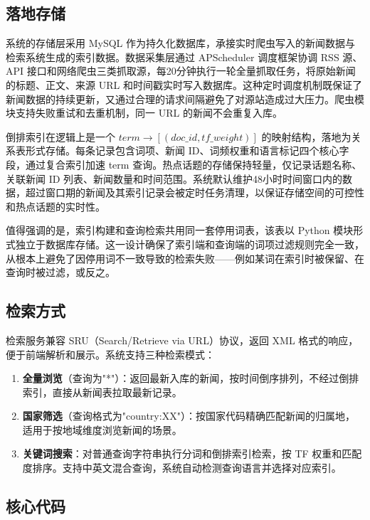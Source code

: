 \documentclass[UTF8,a4paper,zihao=5]{ctexart}
\begin{document}
\subsection{落地存储}

系统的存储层采用 MySQL 作为持久化数据库，承接实时爬虫写入的新闻数据与检索系统生成的索引数据。数据采集层通过 APScheduler 调度框架协调 RSS 源、API 接口和网络爬虫三类抓取源，每20分钟执行一轮全量抓取任务，将原始新闻的标题、正文、来源 URL 和时间戳实时写入数据库。这种定时调度机制既保证了新闻数据的持续更新，又通过合理的请求间隔避免了对源站造成过大压力。爬虫模块支持失败重试和去重机制，同一 URL 的新闻不会重复入库。

倒排索引在逻辑上是一个 $term \rightarrow [(doc\_id, tf\_weight)]$ 的映射结构，落地为关系表形式存储。每条记录包含词项、新闻 ID、词频权重和语言标记四个核心字段，通过复合索引加速 term 查询。热点话题的存储保持轻量，仅记录话题名称、关联新闻 ID 列表、新闻数量和时间范围。系统默认维护48小时时间窗口内的数据，超过窗口期的新闻及其索引记录会被定时任务清理，以保证存储空间的可控性和热点话题的实时性。

值得强调的是，索引构建和查询检索共用同一套停用词表，该表以 Python 模块形式独立于数据库存储。这一设计确保了索引端和查询端的词项过滤规则完全一致，从根本上避免了因停用词不一致导致的检索失败——例如某词在索引时被保留、在查询时被过滤，或反之。

\subsection{检索方式}

检索服务兼容 SRU（Search/Retrieve via URL）协议，返回 XML 格式的响应，便于前端解析和展示。系统支持三种检索模式：

\begin{enumerate}
  \item \textbf{全量浏览}（查询为"*"）：返回最新入库的新闻，按时间倒序排列，不经过倒排索引，直接从新闻表拉取最新记录。
  \item \textbf{国家筛选}（查询格式为"country:XX"）：按国家代码精确匹配新闻的归属地，适用于按地域维度浏览新闻的场景。
  \item \textbf{关键词搜索}：对普通查询字符串执行分词和倒排索引检索，按 TF 权重和匹配度排序。支持中英文混合查询，系统自动检测查询语言并选择对应索引。
\end{enumerate}

\subsection{核心代码}
\end{document}
